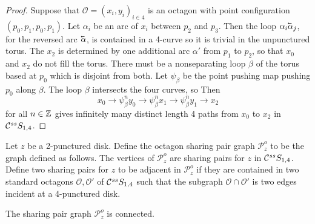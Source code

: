 \begin{proof}
  Suppose that $\mathcal O =(x_i,y_i)_{i \in 4}$ is an octagon with point configuration
  $(p_0,p_1,p_0,p_1)$.
  Let $\alpha_i$ be an arc of $x_i$ between $p_2$ and $p_3$.
  Then the loop $\alpha_i\cev \alpha_j$, for the reversed arc $\cev \alpha$, is contained in a 4-curve
  so it is trivial in the unpunctured torus.
  The $x_2$ is determined by one additional arc $\alpha'$ from $p_1$ to $p_2$,
  so that $x_0$ and $x_2$ do not fill the torus.
  There must be a nonseparating loop $\beta$ of the torus based at $p_0$
  which is disjoint from both.
  Let $\psi_\beta$ be the point pushing map pushing $p_0$ along $\beta$.
  The loop $\beta$ intersects the four curves, so
  Then
  $$x_0 \to \psi^n_\beta y_0 \to \psi^n_\beta x_1 \to \psi^n_\beta y_1 \to  x_2$$
  for all $n\in \mathbb{Z}$ gives infinitely many distinct length 4 paths from $x_0$ to $x_2$
  in $ \mathcal C^{{ss}}  S_{1,4}$.
\end{proof}

\begin{definition}
  Let $z$ be a 2-punctured disk.
  Define the octagon sharing pair graph $\mathcal {P}^o_z$
  to be the graph defined as follows.
  The vertices of $\mathcal {P}^o_z$  are sharing pairs for $z$ in $ \mathcal C^{{ss}}  S_{1,4}$.
  Define two sharing pairs for $z$ to be adjacent in $\mathcal {P}^o_z$ if
  they are contained in two standard octagons $\mathcal O, \mathcal O'$ of $ \mathcal C^{{ss}}  S_{1,4}$
  such that the subgraph $\mathcal O \cap \mathcal O'$ is two edges incident at a 4-punctured disk.
\end{definition}

\begin{lemma}
The sharing pair graph  $\mathcal {P}^o_z$ is connected.
\label{lemma:shareoctconnect}
\end{lemma}

